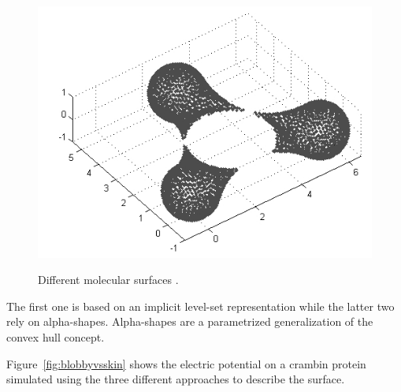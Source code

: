 \documentclass[11pt,a4paper,twocolumn]{article}
\begin{document}
\begin{figure}[H]
{        \includegraphics[scale=0.3]{Images/connolly.jpg}
    }
    \caption{Different molecular surfaces \cite{ref8}.} 
    \label{fig:2}
\end{figure}

The first one is based on an implicit level-set representation while the latter two  rely on alpha-shapes.
Alpha-shapes are a parametrized generalization of the convex hull concept.

Figure~\ref{fig:blobbyvsskin} shows the electric potential on a crambin protein simulated using the three different approaches to describe the surface.

\end{document}
